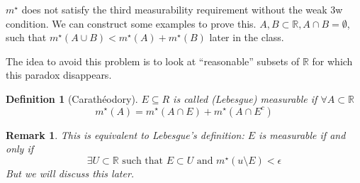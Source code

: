 \documentclass[11pt]{article}
\newtheorem{definition}{Definition}[section]
\newtheorem*{remark}{Remark}
\newcommand{\mstar}[1]{m^{\star}\left(#1\right)}
\begin{document}
    $m^{\star}$ does not satisfy the third measurability requirement without the weak 3w condition.
    We can construct some examples to prove this.
    $A, B \subset \mathbb{R}, A \cap B = \emptyset$, such that $\mstar{A \cup B} < \mstar{A} + \mstar{B}$ later in the class.

    The idea to avoid this problem is to look at ``reasonable'' subsets of $\mathbb{R}$ for which this paradox disappears.

    \begin{definition}[Carath\'eodory]
        $E \subseteq R$ is called (Lebesgue) measurable if $\forall A \subset \mathbb{R}$
        \[
            \mstar{A} = \mstar{A \cap E} + \mstar{A \cap E^c}
        \]
    \end{definition}
    \begin{remark}
        This is equivalent to Lebesgue's definition: $E$ is measurable if and only if
        \[
            \exists U \subset \mathbb{R} \text{ such that } E \subset U \text{ and } \mstar{u \setminus E} < \epsilon
        \]
        But we will discuss this later.
    \end{remark}
\end{document}
